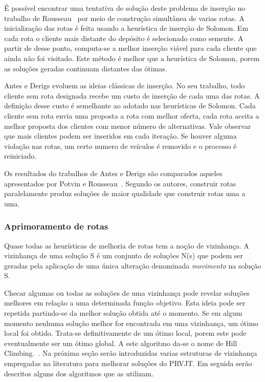 É possível encontrar uma tentativa de solução deste problema de inserção no trabalho de Rousseau~\cite{Rousseau} por meio de construção simultânea de varias rotas. A inicialização das rotas é feita usando a heurística de inserção de Solomon.  Em cada rota o cliente mais distante do depósito é selecionado como semente.  A partir de desse ponto, computa-se a melhor inserção viável para cada cliente que ainda não foi visitado. Este método é melhor que a heurística de Solomon, porem as soluções geradas continuam distantes das ótimas.

Antes  e  Derigs \cite{Derigs} evoluem as ideias clássicas de inserção. No seu trabalho, todo cliente sem rota designada recebe um custo de inserção de cada uma das rotas. A definição
desse custo é semelhante ao adotado nas heurísticas de Solomon.  Cada cliente sem rota
envia uma proposta a rota com melhor oferta, cada rota aceita a melhor proposta dos
clientes com menor número de alternativas.  Vale observar que mais clientes podem ser
inseridos em cada iteração.  Se houver alguma violação nas rotas,  um certo numero de
veículos é removido e o processo é reiniciado. 

Os resultados do trabalhos de Antes e Derigs \cite{Derigs} são comparados aqueles apresentados por Potvin e Rousseau~\cite{Rousseau}. Segundo os autores, construir rotas paralelamente produz soluções de maior qualidade que construir rotas uma a uma.


\subsubsection{Aprimoramento de rotas}

Quase todas as heurísticas de melhoria de rotas tem a noção de vizinhança. A vizinhança de uma solução S é um conjunto de soluções N(s) que podem ser geradas pela aplicação de uma única alteração denominada \textit{movimento} na solução S.

Checar algumas ou todas as soluções de uma vizinhança pode revelar soluções melhores em relação a uma determinada função objetivo. Esta ideia pode ser repetida partindo-se da melhor solução obtida até o momento. Se em algum momento nenhuma solução melhor for encontrada em uma vizinhança, um ótimo local foi obtido.  Trata-se definitivamente de um ótimo local, porem este pode eventualmente ser um ótimo global.  A este algoritmo da-se o nome de Hill Climbing.~\cite{Gendreau}.
Na próxima seção serão introduzidas varias estruturas de vizinhança empregadas na literatura para melhorar soluções do PRVJT. Em seguida serão descritos alguns dos algoritmos que as utilizam.

